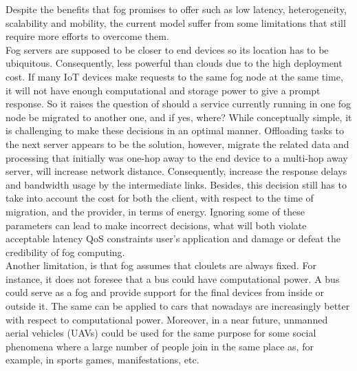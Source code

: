 \noindent\tab Despite the benefits that fog promises to offer such as low latency, heterogeneity, scalability and mobility, the current model suffer from some limitations that still require more efforts to overcome them.\\
\noindent\tab Fog servers are supposed to be closer to end devices so its location has to be ubiquitous. Consequently, less powerful than clouds due to the high deployment cost. If many IoT devices make requests to the same fog node at the same time, it will not have enough computational and storage power to give a prompt response. So it raises the question of should a service currently running in one fog node be migrated to another one, and if yes, where? While conceptually simple, it is challenging to make these decisions in an optimal manner. Offloading tasks to the next server appears to be the solution, however, migrate the related data and processing that initially was one-hop away to the end device to a multi-hop away server, will increase network distance. Consequently, increase the response delays and bandwidth usage by the intermediate links. Besides, this decision still has to take into account the cost for both the client, with respect to the time of migration, and the provider, in terms of energy. Ignoring some of these parameters can lead to make incorrect decisions, what will both violate acceptable latency QoS constraints user's application and damage or defeat the credibility of fog computing.\\
\noindent\tab Another limitation, is that fog assumes that cloulets are always fixed. For instance, it does not foresee that a bus could have computational power. A bus could serve as a fog and provide support for the final devices from inside or outside it. The same can be applied to cars that nowadays are increasingly better with respect to computational power. Moreover, in a near future, unmanned aerial vehicles (UAVs) could be used for the same purpose for some social phenomena where a large number of people join in the same place as, for example, in sports games, manifestations, etc.\\

